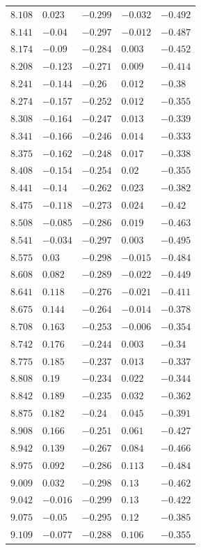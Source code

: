 \begin{table}[h]
\begin{tabular}{rllll}
$8.108$&$0.023$&$-0.299$&$-0.032$&$-0.492$\\
$8.141$&$-0.04$&$-0.297$&$-0.012$&$-0.487$\\
$8.174$&$-0.09$&$-0.284$&$0.003$&$-0.452$\\
$8.208$&$-0.123$&$-0.271$&$0.009$&$-0.414$\\
$8.241$&$-0.144$&$-0.26$&$0.012$&$-0.38$\\
$8.274$&$-0.157$&$-0.252$&$0.012$&$-0.355$\\
$8.308$&$-0.164$&$-0.247$&$0.013$&$-0.339$\\
$8.341$&$-0.166$&$-0.246$&$0.014$&$-0.333$\\
$8.375$&$-0.162$&$-0.248$&$0.017$&$-0.338$\\
$8.408$&$-0.154$&$-0.254$&$0.02$&$-0.355$\\
$8.441$&$-0.14$&$-0.262$&$0.023$&$-0.382$\\
$8.475$&$-0.118$&$-0.273$&$0.024$&$-0.42$\\
$8.508$&$-0.085$&$-0.286$&$0.019$&$-0.463$\\
$8.541$&$-0.034$&$-0.297$&$0.003$&$-0.495$\\
$8.575$&$0.03$&$-0.298$&$-0.015$&$-0.484$\\
$8.608$&$0.082$&$-0.289$&$-0.022$&$-0.449$\\
$8.641$&$0.118$&$-0.276$&$-0.021$&$-0.411$\\
$8.675$&$0.144$&$-0.264$&$-0.014$&$-0.378$\\
$8.708$&$0.163$&$-0.253$&$-0.006$&$-0.354$\\
$8.742$&$0.176$&$-0.244$&$0.003$&$-0.34$\\
$8.775$&$0.185$&$-0.237$&$0.013$&$-0.337$\\
$8.808$&$0.19$&$-0.234$&$0.022$&$-0.344$\\
$8.842$&$0.189$&$-0.235$&$0.032$&$-0.362$\\
$8.875$&$0.182$&$-0.24$&$0.045$&$-0.391$\\
$8.908$&$0.166$&$-0.251$&$0.061$&$-0.427$\\
$8.942$&$0.139$&$-0.267$&$0.084$&$-0.466$\\
$8.975$&$0.092$&$-0.286$&$0.113$&$-0.484$\\
$9.009$&$0.032$&$-0.298$&$0.13$&$-0.462$\\
$9.042$&$-0.016$&$-0.299$&$0.13$&$-0.422$\\
$9.075$&$-0.05$&$-0.295$&$0.12$&$-0.385$\\
$9.109$&$-0.077$&$-0.288$&$0.106$&$-0.355$\\

\end{tabular}
\end{table}
